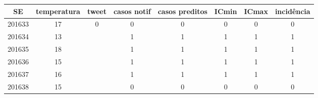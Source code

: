 \begin{tabular}{c|ccccccc}
  \hline
SE & temperatura & tweet & casos notif & casos preditos & ICmin & ICmax & incidência \\ 
  \hline
201633 & 17 & 0 & 0 & 0 & 0 & 0 & 0 \\ 
  201634 & 13 &  & 1 & 1 & 1 & 1 & 1 \\ 
  201635 & 18 &  & 1 & 1 & 1 & 1 & 1 \\ 
  201636 & 15 &  & 1 & 1 & 1 & 1 & 1 \\ 
  201637 & 16 &  & 1 & 1 & 1 & 1 & 1 \\ 
  201638 & 15 &  & 0 & 0 & 0 & 0 & 0 \\ 
   \hline
\end{tabular}

